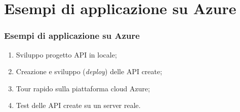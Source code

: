 \documentclass{beamer}
\begin{document}
	\section{Esempi di applicazione su Azure}
	\begin{frame}
		\frametitle{Esempi di applicazione su Azure}
		\begin{enumerate}
			\item Sviluppo progetto API in locale;
			
			\item Creazione e sviluppo (\emph{deploy}) delle API create;
			
			\item Tour rapido sulla piattaforma cloud Azure;
			
			\item Test delle API create su un server reale.
		\end{enumerate}
	\end{frame}
\end{document}
